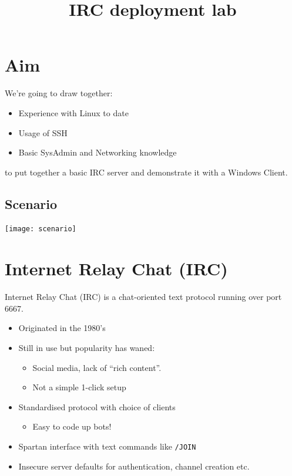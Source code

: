 \documentclass[slides]{pgnotes}
\title{IRC deployment lab}
\begin{document}
\maketitle

\tableofcontents

\section{Aim}

We're going to draw together:

\begin{itemize}
\item Experience with Linux to date
\item Usage of SSH
\item Basic SysAdmin and Networking knowledge
\end{itemize}

to put together a basic IRC server and demonstrate it with a Windows Client.

\subsection{Scenario}

\begin{center}
\texttt{[image: scenario]}
\end{center}


\section{Internet Relay Chat (IRC)}

Internet Relay Chat (IRC) is a chat-oriented text protocol running over port 6667.

\begin{itemize}
\item Originated in the 1980's
\item Still in use but popularity has waned:
  \begin{itemize}
  \item Social media, lack of ``rich content''.
  \item Not a simple 1-click setup
  \end{itemize}
\item Standardised protocol with choice of clients
  \begin{itemize}
  \item Easy to code up bots!
  \end{itemize}
\item Spartan interface with text commands like \texttt{/JOIN}
\item Insecure server defaults for authentication, channel creation etc.
\end{itemize}
\end{document}
